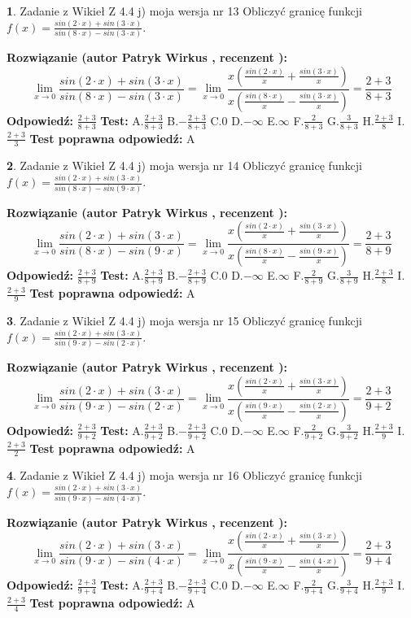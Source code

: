 \documentclass[12pt, a4paper]{article}
\theoremstyle{definition} %
\newtheorem{zad}{}
\newcommand{\zadStart}[1]{\begin{zad}#1\newline}
\newcommand{\zadStop}{\end{zad}}
\newcommand{\rozwStart}[2]{\noindent \textbf{Rozwiązanie (autor #1 , recenzent #2): }\newline}
\newcommand{\rozwStop}{\newline}
\newcommand{\odpStart}{\noindent \textbf{Odpowiedź:}\newline}
\newcommand{\odpStop}{\newline}
\newcommand{\testStart}{\noindent \textbf{Test:}\newline}
\newcommand{\testStop}{\newline}
\newcommand{\kluczStart}{\noindent \textbf{Test poprawna odpowiedź:}\newline}
\newcommand{\kluczStop}{\newline}
\begin{document}
\zadStart{Zadanie z Wikieł Z 4.4 j) moja wersja nr 13}
Obliczyć granicę funkcji $f(x)=\frac{sin(2\cdot x) +sin(3\cdot x)}{sin(8\cdot x) -sin(3\cdot x)}$.
\zadStop
\rozwStart{Patryk Wirkus}{}
$$\lim\limits_{x\to 0}\frac{sin(2\cdot x) +sin(3\cdot x)}{sin(8\cdot x) -sin(3\cdot x)}=\lim\limits_{x\to 0}\frac{x(\frac{sin(2\cdot x)}{x}+\frac{sin(3\cdot x)}{x})}{x(\frac{sin(8\cdot x)}{x}-\frac{sin(3\cdot x)}{x})}=\frac{2+3}{8+3}$$
\rozwStop
\odpStart
$\frac{2+3}{8+3}$
\odpStop
\testStart
A.$\frac{2+3}{8+3}$
B.$-\frac{2+3}{8+3}$
C.$0$
D.$-\infty$
E.$\infty$
F.$\frac{2}{8+3}$
G.$\frac{3}{8+3}$
H.$\frac{2+3}{8}$
I.$\frac{2+3}{3}$
\testStop
\kluczStart
A
\kluczStop



\zadStart{Zadanie z Wikieł Z 4.4 j) moja wersja nr 14}
Obliczyć granicę funkcji $f(x)=\frac{sin(2\cdot x) +sin(3\cdot x)}{sin(8\cdot x) -sin(9\cdot x)}$.
\zadStop
\rozwStart{Patryk Wirkus}{}
$$\lim\limits_{x\to 0}\frac{sin(2\cdot x) +sin(3\cdot x)}{sin(8\cdot x) -sin(9\cdot x)}=\lim\limits_{x\to 0}\frac{x(\frac{sin(2\cdot x)}{x}+\frac{sin(3\cdot x)}{x})}{x(\frac{sin(8\cdot x)}{x}-\frac{sin(9\cdot x)}{x})}=\frac{2+3}{8+9}$$
\rozwStop
\odpStart
$\frac{2+3}{8+9}$
\odpStop
\testStart
A.$\frac{2+3}{8+9}$
B.$-\frac{2+3}{8+9}$
C.$0$
D.$-\infty$
E.$\infty$
F.$\frac{2}{8+9}$
G.$\frac{3}{8+9}$
H.$\frac{2+3}{8}$
I.$\frac{2+3}{9}$
\testStop
\kluczStart
A
\kluczStop



\zadStart{Zadanie z Wikieł Z 4.4 j) moja wersja nr 15}
Obliczyć granicę funkcji $f(x)=\frac{sin(2\cdot x) +sin(3\cdot x)}{sin(9\cdot x) -sin(2\cdot x)}$.
\zadStop
\rozwStart{Patryk Wirkus}{}
$$\lim\limits_{x\to 0}\frac{sin(2\cdot x) +sin(3\cdot x)}{sin(9\cdot x) -sin(2\cdot x)}=\lim\limits_{x\to 0}\frac{x(\frac{sin(2\cdot x)}{x}+\frac{sin(3\cdot x)}{x})}{x(\frac{sin(9\cdot x)}{x}-\frac{sin(2\cdot x)}{x})}=\frac{2+3}{9+2}$$
\rozwStop
\odpStart
$\frac{2+3}{9+2}$
\odpStop
\testStart
A.$\frac{2+3}{9+2}$
B.$-\frac{2+3}{9+2}$
C.$0$
D.$-\infty$
E.$\infty$
F.$\frac{2}{9+2}$
G.$\frac{3}{9+2}$
H.$\frac{2+3}{9}$
I.$\frac{2+3}{2}$
\testStop
\kluczStart
A
\kluczStop



\zadStart{Zadanie z Wikieł Z 4.4 j) moja wersja nr 16}
Obliczyć granicę funkcji $f(x)=\frac{sin(2\cdot x) +sin(3\cdot x)}{sin(9\cdot x) -sin(4\cdot x)}$.
\zadStop
\rozwStart{Patryk Wirkus}{}
$$\lim\limits_{x\to 0}\frac{sin(2\cdot x) +sin(3\cdot x)}{sin(9\cdot x) -sin(4\cdot x)}=\lim\limits_{x\to 0}\frac{x(\frac{sin(2\cdot x)}{x}+\frac{sin(3\cdot x)}{x})}{x(\frac{sin(9\cdot x)}{x}-\frac{sin(4\cdot x)}{x})}=\frac{2+3}{9+4}$$
\rozwStop
\odpStart
$\frac{2+3}{9+4}$
\odpStop
\testStart
A.$\frac{2+3}{9+4}$
B.$-\frac{2+3}{9+4}$
C.$0$
D.$-\infty$
E.$\infty$
F.$\frac{2}{9+4}$
G.$\frac{3}{9+4}$
H.$\frac{2+3}{9}$
I.$\frac{2+3}{4}$
\testStop
\kluczStart
A
\kluczStop
\end{document}
